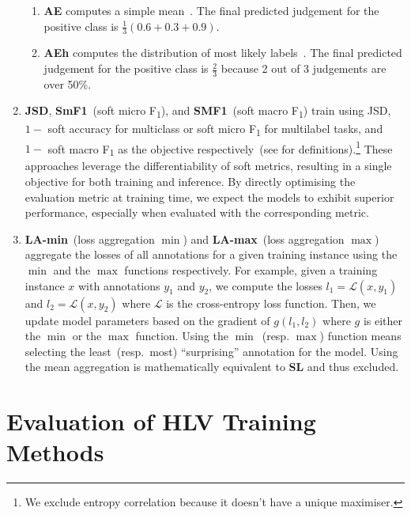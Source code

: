 \documentclass[shortpaper]{clv2025}
\newcommand{\methname}[1]{\textbf{#1}}  %
\begin{document}
\begin{enumerate}
    \begin{enumerate}
      \item \methname{AE} computes a simple mean~\citep{sullivan2023}. The final
        predicted judgement for the positive class is
        $\frac{1}{3}\left(0.6+0.3+0.9\right)$.
      \item \methname{AEh} computes the distribution of most likely
        labels~\citep{vitsakis2023}. The final predicted judgement for the
        positive class is $\frac{2}{3}$ because 2 out of 3 judgements are over
        50\%.
    \end{enumerate}
  \item \methname{JSD}, \methname{SmF1}~(soft micro F\textsubscript{1}), and
    \methname{SMF1}~(soft macro F\textsubscript{1}) train using JSD, $1-$ soft
    accuracy for multiclass or soft micro F\textsubscript{1} for multilabel
    tasks, and $1-$ soft macro F\textsubscript{1} as the objective
    respectively~(see  for definitions).\footnote{We
      exclude entropy correlation because it doesn't have a unique maximiser.}
    These approaches leverage the differentiability of soft metrics, resulting
    in a single objective for both training and inference. By directly
    optimising the evaluation metric at training time, we expect the models to
    exhibit superior performance, especially when evaluated with the
    corresponding metric.
  \item \methname{LA-min}~(loss aggregation $\min$) and \methname{LA-max}~(loss
    aggregation $\max$) aggregate the losses of all annotations for a given
    training instance using the $\min$ and the $\max$ functions respectively.
    For example, given a training instance $x$ with annotations $y_1$ and $y_2$,
    we compute the losses $l_1=\mathcal{L}(x,y_1)$ and $l_2=\mathcal{L}(x,y_2)$
    where $\mathcal{L}$ is the cross-entropy loss function. Then, we update
    model parameters based on the gradient of $g(l_1,l_2)$ where $g$ is either
    the $\min$ or the $\max$ function. Using the $\min$~(resp. $\max$) function
    means selecting the least~(resp.\ most) ``surprising'' annotation for the
    model. Using the mean aggregation is mathematically equivalent to
    \methname{SL} and thus excluded.
\end{enumerate}

\section{Evaluation of HLV Training Methods}
\end{document}
